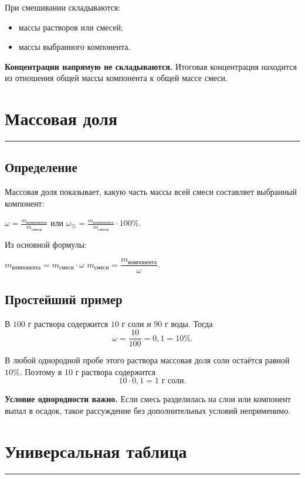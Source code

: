 \documentclass[a4paper,12pt]{article}
\newcommand{\sectionline}{%
  \par\vspace{2pt}
  {\color{accent}\rule{\linewidth}{0.7pt}}
  \vspace{4pt}
}
\newcommand{\warning}[1]{\textcolor{warm}{\textbf{#1}}}
\newcommand{\formula}[1]{%
  \begin{center}
    \begin{minipage}{0.9\linewidth}
      \centering\large\color{darkaccent}#1
    \end{minipage}
  \end{center}
}
\begin{document}
При смешивании складываются:
\begin{itemize}[leftmargin=7mm]
  \item массы растворов или смесей;
  \item массы выбранного компонента.
\end{itemize}

\warning{Концентрации напрямую не складываются.}
Итоговая концентрация находится из отношения общей массы компонента к общей
массе смеси.

\section{Массовая доля}
\sectionline

\subsection{Определение}

Массовая доля показывает, какую часть массы всей смеси составляет выбранный
компонент:

\formula{
  $\displaystyle
  \omega=\frac{m_{\text{компонента}}}{m_{\text{смеси}}}$
  \qquad или \qquad
  $\displaystyle
  \omega_{\%}=\frac{m_{\text{компонента}}}{m_{\text{смеси}}}\cdot100\%$.
}

Из основной формулы:

\formula{
  $m_{\text{компонента}}=m_{\text{смеси}}\cdot\omega$
  \qquad
  $m_{\text{смеси}}=\dfrac{m_{\text{компонента}}}{\omega}$.
}

\subsection{Простейший пример}

В $100$ г раствора содержится $10$ г соли и $90$ г воды. Тогда
\[
  \omega=\frac{10}{100}=0{,}1=10\%.
\]

В любой однородной пробе этого раствора массовая доля соли остаётся равной
$10\%$. Поэтому в $10$ г раствора содержится
\[
  10\cdot0{,}1=1\text{ г соли}.
\]

\warning{Условие однородности важно.} Если смесь разделилась на слои или
компонент выпал в осадок, такое рассуждение без дополнительных условий
неприменимо.

\section{Универсальная таблица}
\sectionline
\end{document}
